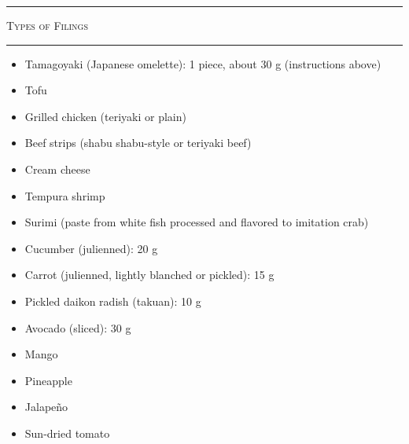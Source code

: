 \documentclass[landscape, a4paper]{article}
\begin{document}
\begin{minipage}[t]{0.31\textwidth}
	\textcolor{PrimaryColor}{
		\rule{\linewidth}{0.5mm}
		\vspace{-0.1cm}
		\begin{center}
			\large
			\textsc{Types of Filings}
		\end{center}
		\rule{\linewidth}{0.5mm}
	}

	\begin{minipage}[t]{0.48\textwidth}
		\begin{itemize}
			\item Tamagoyaki (Japanese omelette): 1 piece, about 30 g (instructions above)
      \item Tofu
      \item Grilled chicken (teriyaki or plain)
      \item Beef strips (shabu shabu-style or teriyaki beef)
      \item Cream cheese
      \item Tempura shrimp
      \item Surimi (paste from white fish processed and flavored to imitation crab)
		\end{itemize}
	\end{minipage}
	\hfill
	\begin{minipage}[t]{0.48\textwidth}
		\begin{itemize}
			\item Cucumber (julienned): 20 g
			\item Carrot (julienned, lightly blanched or pickled): 15 g
      \item Pickled daikon radish (takuan): 10 g
      \item Avocado (sliced): 30 g
      \item Mango
      \item Pineapple
      \item Jalapeño
      \item Sun-dried tomato
		\end{itemize}
	\end{minipage}

\end{minipage}%
\end{document}

